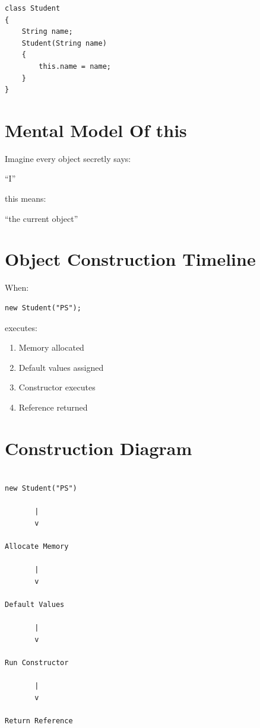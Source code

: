 \documentclass[11pt,a4paper]{book}
\begin{document}
\begin{verbatim}
class Student
{
    String name;
    Student(String name)
    {
        this.name = name;
    }
}
\end{verbatim}


\section{Mental Model Of this}

\begin{mentalmodel}

Imagine every object secretly says:

``I''

this means:

``the current object''

\end{mentalmodel}


\section{Object Construction Timeline}

When:

\begin{verbatim}
new Student("PS");
\end{verbatim}

executes:

\begin{enumerate}

\item Memory allocated

\item Default values assigned

\item Constructor executes

\item Reference returned

\end{enumerate}


\section{Construction Diagram}

\begin{verbatim}

new Student("PS")

       |
       v

Allocate Memory

       |
       v

Default Values

       |
       v

Run Constructor

       |
       v

Return Reference

\end{verbatim}
\end{document}
